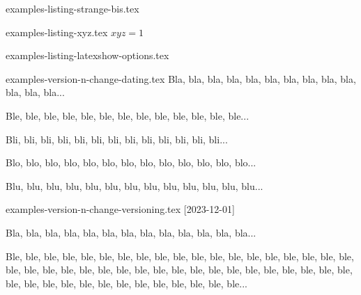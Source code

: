 \begin{filecontents*}[overwrite]{examples-listing-strange-bis.tex}
\begin{tdoclatex}
\end{tdoclatex}
\end{filecontents*}


\begin{filecontents*}[overwrite]{examples-listing-xyz.tex}
$x y z = 1$
\end{filecontents*}


\begin{filecontents*}[overwrite]{examples-listing-latexshow-options.tex}
\end{filecontents*}


\begin{filecontents*}[overwrite]{examples-version-n-change-dating.tex}
Bla, bla, bla, bla, bla, bla, bla, bla, bla, bla, bla, bla, bla...

\medskip %


Ble, ble, ble, ble, ble, ble, ble, ble, ble, ble, ble, ble, ble...

\medskip %


Bli, bli, bli, bli, bli, bli, bli, bli, bli, bli, bli, bli, bli...

Blo, blo, blo, blo, blo, blo, blo, blo, blo, blo, blo, blo, blo...

Blu, blu, blu, blu, blu, blu, blu, blu, blu, blu, blu, blu, blu...
\end{filecontents*}


\begin{filecontents*}[overwrite]{examples-version-n-change-versioning.tex}
[2023-12-01]

Bla, bla, bla, bla, bla, bla, bla, bla, bla, bla, bla, bla, bla...

\bigskip %


Ble, ble, ble, ble, ble, ble, ble, ble, ble, ble, ble, ble, ble,
ble, ble, ble, ble, ble, ble, ble, ble, ble, ble, ble, ble, ble,
ble, ble, ble, ble, ble, ble, ble, ble, ble, ble, ble, ble, ble,
ble, ble, ble, ble, ble, ble, ble, ble, ble, ble, ble, ble...
\end{filecontents*}


